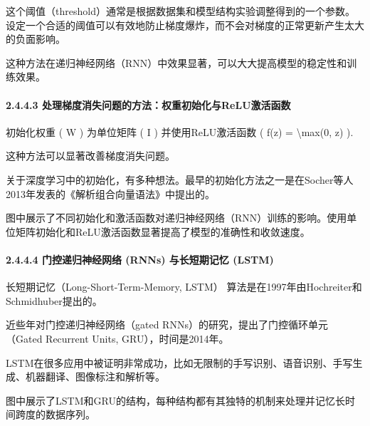 这个阈值（threshold）通常是根据数据集和模型结构实验调整得到的一个参数。设定一个合适的阈值可以有效地防止梯度爆炸，而不会对梯度的正常更新产生太大的负面影响。

这种方法在递归神经网络（RNN）中效果显著，可以大大提高模型的稳定性和训练效果。

\paragraph{\texorpdfstring{\textbf{2.4.4.3}
\textbf{处理梯度消失问题的方法：权重初始化与ReLU激活函数}}{2.4.4.3 处理梯度消失问题的方法：权重初始化与ReLU激活函数}}\label{2443-ux5904ux7406ux68afux5ea6ux6d88ux5931ux95eeux9898ux7684ux65b9ux6cd5ux6743ux91cdux521dux59cbux5316ux4e0ereluux6fc0ux6d3bux51fdux6570}

初始化权重 ( W ) 为单位矩阵 ( I ) 并使用ReLU激活函数 ( f(z) =
\textbackslash max(0, z) ).

这种方法可以显著改善梯度消失问题。

关于深度学习中的初始化，有多种想法。最早的初始化方法之一是在Socher等人2013年发表的《解析组合向量语法》中提出的。


图中展示了不同初始化和激活函数对递归神经网络（RNN）训练的影响。使用单位矩阵初始化和ReLU激活函数显著提高了模型的准确性和收敛速度。

\paragraph{\texorpdfstring{\textbf{2.4.4.4} \textbf{门控递归神经网络
(RNNs) 与长短期记忆
(LSTM)}}{2.4.4.4 门控递归神经网络 (RNNs) 与长短期记忆 (LSTM)}}\label{2444-ux95e8ux63a7ux9012ux5f52ux795eux7ecfux7f51ux7edc-rnns-ux4e0eux957fux77edux671fux8bb0ux5fc6-lstm}

长短期记忆（Long-Short-Term-Memory, LSTM）
算法是在1997年由Hochreiter和Schmidhuber提出的。

近些年对门控递归神经网络（gated RNNs）的研究，提出了门控循环单元（Gated
Recurrent Units, GRU），时间是2014年。

LSTM在很多应用中被证明非常成功，比如无限制的手写识别、语音识别、手写生成、机器翻译、图像标注和解析等。

图中展示了LSTM和GRU的结构，每种结构都有其独特的机制来处理并记忆长时间跨度的数据序列。



